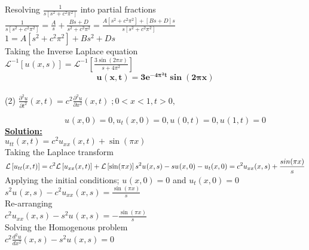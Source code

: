 \documentclass[a4paper 11pt]{article}
\newcommand{\Laplace}{\mathcal{L}}
\newcommand{\sbracket}[1]{\left[#1\right]}
\newcommand{\Un}[2]{u_{#1}(#2)}
\newcommand{\NI}{\noindent}
\newcommand{\psq}{\pi^{2}}
\newcommand{\InverseL}[1]{\Laplace^{-1}\left[#1\right]}
\newcommand{\LT}[1]{\Laplace \left[#1\right]}
\begin{document}
\NI Resolving $\displaystyle \frac{1}{s\sbracket{s^{2} + c^{2}\psq}}$ into partial fractions \\[0.2cm]
$\displaystyle
\frac{1}{s\sbracket{s^{2} + c^{2}\psq}} = \frac{A}{s} + \frac{Bs + D}{s^{2} + c^{2}\psq} = \frac{A\sbracket{s^2 + c^2 \psq} + \sbracket{Bs + D}s}{s\sbracket{s^2 + c^2 \psq}}
$\\[0.3cm]
$\displaystyle
1 = A \sbracket{s^2 + c^2 \psq} + Bs^2 + Ds
$\\[0.3cm]

\NI Taking the Inverse Laplace equation\\[0.2cm]
$\displaystyle
\InverseL{\Un{}{x,s}} = \InverseL{\frac{3\sin(2\pi x)}{s + 4\psq}}
$\\[0.3cm]

$$ \mathbf{
\Un{}{x,t} = 3e^{-4\psq t}\sin(2\pi x)}
$$
\\[0.5cm]
\NI (2) $\displaystyle \frac{\partial^2 u}{\partial t^2}(x,t) = c^2 \frac{\partial^2 u}{\partial x^2}(x,t) \; ; 0<x<1, t > 0, $

$\hspace{3cm} \displaystyle \Un{}{x,0} = 0, \Un{t}{x,0} = 0,  \Un{}{0,t} = 0,  \Un{}{1,t} = 0$\\

\NI \underline{\textbf{Solution:}} \\[0.2cm]
$\displaystyle \Un{tt}{x,t} = c^2 \Un{xx}{x,t} + \sin(\pi x) $\\[0.2cm]

\NI Taking the Laplace transform \\[0.2cm]
$\displaystyle
\LT{\Un{tt}{x,t}} = c^2 \LT{\Un{xx}{x,t}} + \LT{\sin(\pi x)} \\[0.1cm]
s^2 \Un{}{x,s} - s\Un{}{x,0} - \Un{t}{x,0} = c^2 \Un{xx}{x,s} + \frac{sin(\pi x)}{s}
$\\[0.2cm]

\NI Applying the initial conditions; $\Un{}{x,0} = 0$ and $\Un{t}{x,0} = 0 $ \\[0.2cm]
$\displaystyle
s^2\Un{}{x,s} - c^2 \Un{xx}{x,s} = \frac{\sin(\pi x)}{s}
$\\[0.2cm]

\NI Re-arranging \\[0.2cm]
$\displaystyle
c^2 \Un{xx}{x,s} - s^2 \Un{}{x,s} = - \frac{\sin(\pi x)}{s}
$\\[2cm]

\NI Solving the Homogenous problem \\[0.2cm]
$\displaystyle
c^{2} \frac{d^2 u}{dx^2}(x,s) - s^2 \Un{}{x,s} = 0
$\\[0.2cm]
\end{document}

